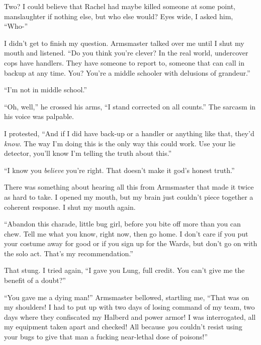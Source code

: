 Two?  I could believe that Rachel had maybe killed someone at some point, manslaughter if nothing else, but who else would?  Eyes wide, I asked him, ``Who-''



I didn't get to finish my question.  Armsmaster talked over me until I shut my mouth and listened.  ``Do you think you're clever?  In the real world, undercover cops have handlers.  They have someone to report to, someone that can call in backup at any time.  You?  You're a middle schooler with delusions of grandeur.''



``I'm not in middle school.''



``Oh, well,'' he crossed his arms, ``I stand corrected on all counts.'' The sarcasm in his voice was palpable.



I protested, ``And if I did have back-up or a handler or anything like that, they'd \emph{know}.  The way I'm doing this is the only way this could work.  Use your lie detector, you'll know I'm telling the truth about this.''



``I know you \emph{believe} you're right.  That doesn't make it god's honest truth.''



There was something about hearing all this from Armsmaster that made it twice as hard to take.  I opened my mouth, but my brain just couldn't piece together a coherent response.  I shut my mouth again.



``Abandon this charade, little bug girl, before you bite off more than you can chew.  Tell me what you know, right now, then go home.  I don't care if you put your costume away for good or if you sign up for the Wards, but don't go on with the solo act.  That's my recommendation.''



That stung.  I tried again, ``I gave you Lung, full credit.  You can't give me the benefit of a doubt?''



``You gave me a dying man!'' Armsmaster bellowed, startling me, ``That was on my shoulders!  I had to put up with two days of losing command of my team, two days where they confiscated my Halberd and power armor!  I was interrogated, all my equipment taken apart and checked!  All because \emph{you} couldn't resist using your bugs to give that man a fucking near-lethal dose of poisons!''



